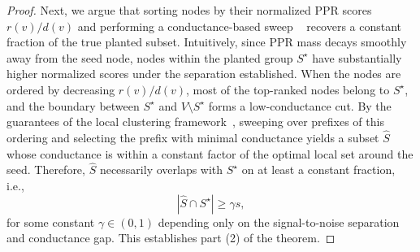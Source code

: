 \begin{proof}
\vspace{3mm}
\noindent Next, we argue that sorting nodes by their normalized PPR scores $r(v)/d(v)$ and performing a conductance-based sweep ~\parencite{andersen2006local} recovers a constant fraction of the true planted subset. Intuitively, since PPR mass decays smoothly away from the seed node, nodes within the planted group $S^\star$ have substantially higher normalized scores under the separation established. When the nodes are ordered by decreasing $r(v)/d(v)$, most of the top-ranked nodes belong to $S^\star$, and the boundary between $S^\star$ and $V\setminus S^\star$ forms a low-conductance cut.
By the guarantees of the local clustering framework~\parencite{andersen2006local}, sweeping over prefixes of this ordering and selecting the prefix with minimal conductance yields a subset $\widehat S$ whose conductance is within a constant factor of the optimal local set around the seed. Therefore, $\widehat S$ necessarily overlaps with $S^\star$ on at least a constant fraction, i.e.,
\[
    |\widehat S \cap S^\star| \ge \gamma s,
\]
for some constant $\gamma \in (0,1)$ depending only on the signal-to-noise separation and conductance gap. This establishes part (2) of the theorem.


\end{proof}
